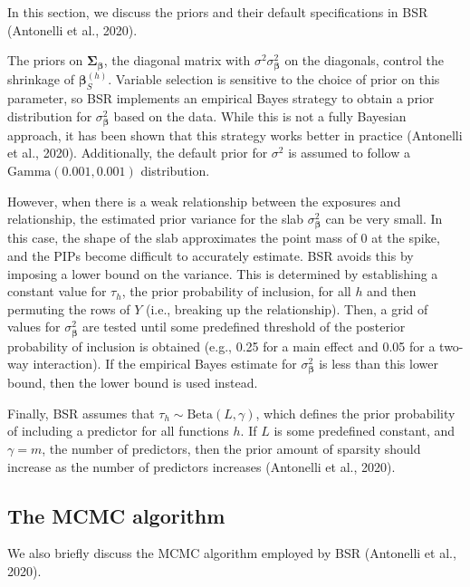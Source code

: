 \documentclass[12pt, twoside]{amherstthesis}
\begin{document}
In this section, we discuss the priors and their default specifications in BSR (Antonelli et al., 2020).

The priors on \(\boldsymbol\Sigma_{\boldsymbol\beta}\), the diagonal matrix with \(\sigma^2\sigma^2_{\boldsymbol\beta}\) on the diagonals, control the shrinkage of \(\boldsymbol\beta_S^{(h)}\). Variable selection is sensitive to the choice of prior on this parameter, so BSR implements an empirical Bayes strategy to obtain a prior distribution for \(\sigma^2_{\boldsymbol\beta}\) based on the data. While this is not a fully Bayesian approach, it has been shown that this strategy works better in practice (Antonelli et al., 2020). Additionally, the default prior for \(\sigma^2\) is assumed to follow a \(\textrm{Gamma}(0.001, 0.001)\) distribution.

However, when there is a weak relationship between the exposures and relationship, the estimated prior variance for the slab \(\sigma^2_{\boldsymbol\beta}\) can be very small. In this case, the shape of the slab approximates the point mass of 0 at the spike, and the PIPs become difficult to accurately estimate. BSR avoids this by imposing a lower bound on the variance. This is determined by establishing a constant value for \(\tau_h\), the prior probability of inclusion, for all \(h\) and then permuting the rows of \(Y\) (i.e., breaking up the relationship). Then, a grid of values for \(\sigma^2_{\boldsymbol\beta}\) are tested until some predefined threshold of the posterior probability of inclusion is obtained (e.g., 0.25 for a main effect and 0.05 for a two-way interaction). If the empirical Bayes estimate for \(\sigma^2_{\boldsymbol\beta}\) is less than this lower bound, then the lower bound is used instead.

Finally, BSR assumes that \(\tau_h \sim \textrm{Beta}(L,\gamma)\), which defines the prior probability of including a predictor for all functions \(h\). If \(L\) is some predefined constant, and \(\gamma=m\), the number of predictors, then the prior amount of sparsity should increase as the number of predictors increases (Antonelli et al., 2020).

\hypertarget{the-mcmc-algorithm-1}{%
\subsection{The MCMC algorithm}\label{the-mcmc-algorithm-1}}

We also briefly discuss the MCMC algorithm employed by BSR (Antonelli et al., 2020).
\end{document}

